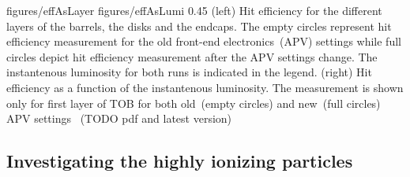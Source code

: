                  {figures/effAsLayer}
                 {figures/effAsLumi} %
                 {0.45}       %
                 {(left) Hit efficiency for the different layers of the barrels, the disks and the endcaps. The empty circles represent hit efficiency measurement for the old front-end electronics~(APV) settings while full circles depict hit efficiency measurement after the APV settings change. The instantenous luminosity for both runs is indicated in the legend. (right) Hit efficiency as a function of the instantenous luminosity. The measurement is shown only for first layer of TOB for both old~(empty circles) and new~(full circles) APV settings~\cite{website:hitEff} (TODO pdf and latest version) } %







\subsection{Investigating the highly ionizing particles}

